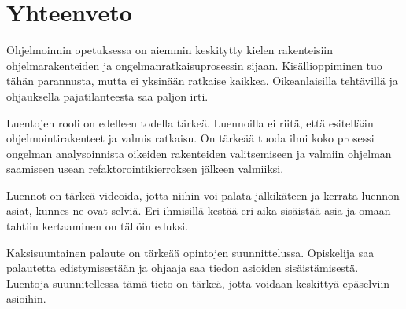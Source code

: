 \section{Yhteenveto}

Ohjelmoinnin opetuksessa on aiemmin keskitytty kielen rakenteisiin
ohjelmarakenteiden ja ongelmanratkaisuprosessin sijaan. Kisällioppiminen tuo
tähän parannusta, mutta ei yksinään ratkaise kaikkea. Oikeanlaisilla tehtävillä
ja ohjauksella pajatilanteesta saa paljon irti.

Luentojen rooli on edelleen todella tärkeä. Luennoilla ei riitä, että esitellään
ohjelmointirakenteet ja valmis ratkaisu. On tärkeää tuoda ilmi koko prosessi
ongelman analysoinnista oikeiden rakenteiden valitsemiseen ja valmiin ohjelman
saamiseen usean refaktorointikierroksen jälkeen valmiiksi.

Luennot on tärkeä videoida, jotta niihin voi palata jälkikäteen ja kerrata
luennon asiat, kunnes ne ovat selviä. Eri ihmisillä kestää eri aika sisäistää
asia ja omaan tahtiin kertaaminen on tällöin eduksi.

Kaksisuuntainen palaute on tärkeää opintojen suunnittelussa. Opiskelija saa
palautetta edistymisestään ja ohjaaja saa tiedon asioiden sisäistämisestä.
Luentoja suunnitellessa tämä tieto on tärkeä, jotta voidaan keskittyä epäselviin
asioihin.

